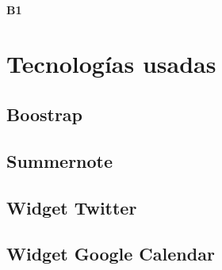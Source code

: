 \documentclass[10pt, spanish, pdftex]{template/UC3M_document}
\begin{document}
\paragraph{B1}
\newpage

\section{Tecnologías usadas}
\subsection{Boostrap}
\subsection{Summernote}
\subsection{Widget Twitter}
\subsection{Widget Google Calendar}
\end{document}
